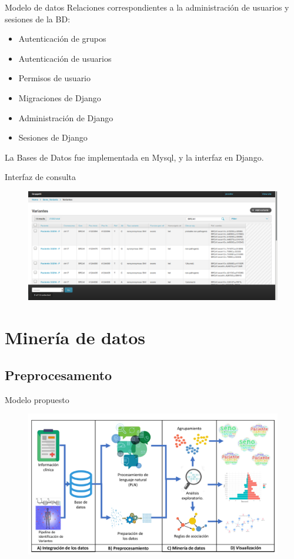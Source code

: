 \documentclass[xcolor=dvipsnames]{beamer}
\begin{document}
\begin{frame}{Modelo de datos}
     Relaciones correspondientes a la administración de usuarios y sesiones de la BD:
    \begin{itemize}
    	\item Autenticación de grupos
    	\item Autenticación de usuarios
    	\item Permisos de usuario
    	\item Migraciones de Django 
    	\item Administración de Django
    	\item Sesiones de Django	 	
    \end{itemize}
La Bases de Datos fue implementada en Mysql, y la interfaz en Django.
\end{frame}



\begin{frame}{Interfaz de consulta}
	\begin{figure}
		\includegraphics[width=\textwidth]{consulta}
		\newline
	\end{figure}
\end{frame}
\section{Minería de datos}
\subsection{Preprocesamento}

\begin{frame}{Modelo propuesto}
\begin{figure}
\includegraphics[width=1\textwidth]{KDDtesis.pdf}
\end{figure}
\end{frame}
\end{document}
